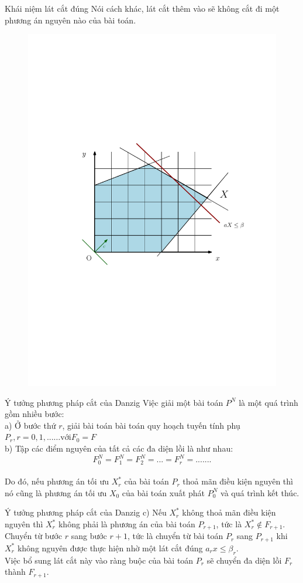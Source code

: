 \documentclass[10pt]{beamer}
\begin{document}
    \begin{frame}{Khái niệm lát cắt đúng}
         Nói cách khác, lát cắt thêm vào sẽ không cắt đi một phương án nguyên nào của bài toán.\\
    \vspace{0.5cm}
    \begin{figure}[h]
        \centering
        \includegraphics[width=0.5\linewidth]{anh2.pdf}
       
    \end{figure}
    \end{frame}

    \begin{frame}{ Ý tưởng phương pháp cắt của Danzig}
         Việc giải một bài toán $P^N$ là một quá trình gồm nhiều bước:\\
a) Ở bước thứ $r$,  giải bài toán bài toán quy hoạch tuyến tính phụ 
 $P_r, r = 0,1,... 
… \text{với}   F_0=F $\\
b) Tập các điểm  nguyên của tất cả các đa diện lồi là như nhau:
$$F_0^N=F_1^N=F_2^N=...=F_r^N=.......$$\\
Do đó, nếu phương án tối ưu $X^*_r$ của bài toán $P_r$ thoả mãn điều kiện nguyên thì nó cũng là phương án tối ưu $X_0$ của bài toán xuất phát $P^N_0$ và quá trình kết thúc.\\
\end{frame}

    \begin{frame}{ Ý tưởng phương pháp cắt của Danzig}
c)  Nếu $X^*_r$ không thoả mãn điều kiện nguyên thì $X^*_r$ không phải là 
phương án của bài toán $P_{r+1}$, tức là $X_r^*\notin F_{r+1}$.\\Chuyển từ bước $r$ sang bước $r+1$, tức là chuyển từ bài toán $P_r$ sang 
 $P_{r+1}$ khi $X^*_r$ không nguyên được thực hiện nhờ một lát cắt đúng $a_rx \le \beta_r$.\\
Việc bổ sung lát cắt này vào ràng buộc của bài toán $P_r$ sẽ chuyển đa diện lồi $F_r$ thành $F_{r+1}$.\\
    \end{frame}
\end{document}
